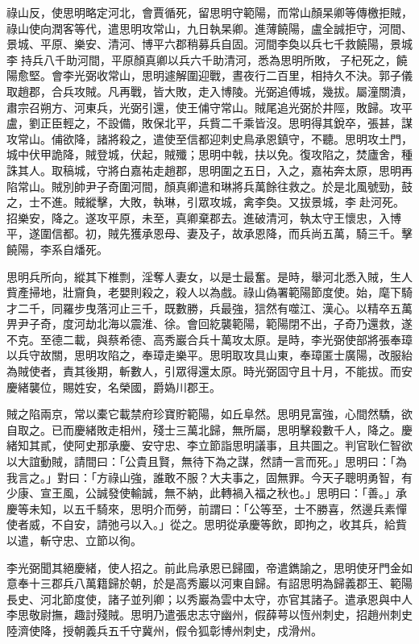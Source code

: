 \begin{pinyinscope}
 祿山反，使思明略定河北，會賈循死，留思明守範陽，而常山顏杲卿等傳檄拒賊，祿山使向潤客等代，遣思明攻常山，九日執杲卿。進薄饒陽，盧全誠拒守，河間、景城、平原、樂安、清河、博平六郡稍募兵自固。河間李奐以兵七千救饒陽，景城李持兵八千助河間，平原顏真卿以兵六千助清河，悉為思明所敗，子杞死之，饒陽愈堅。會李光弼收常山，思明遽解圍迎戰，晝夜行二百里，相持久不決。郭子儀取趙郡，合兵攻賊。凡再戰，皆大敗，走入博陵。光弼追傅城，幾拔。屬潼關潰，肅宗召朔方、河東兵，光弼引還，使王俌守常山。賊尾追光弼於井陘，敗歸。攻平盧，劉正臣輕之，不設備，敗保北平，兵貲二千乘皆沒。思明得其銳卒，張甚，謀攻常山。俌欲降，諸將殺之，遣使至信都迎刺史鳥承恩鎮守，不聽。思明攻土門，城中伏甲詭降，賊登城，伏起，賊殲；思明中戟，扶以免。復攻陷之，焚廬舍，種誅其人。取稿城，守將白嘉祐走趙郡，思明圍之五日，入之，嘉祐奔太原，思明再陷常山。賊別帥尹子奇圍河間，顏真卿遣和琳將兵萬餘往救之。於是北風號勁，鼓之，士不進。賊縱擊，大敗，執琳，引眾攻城，禽李奐。又拔景城，李赴河死。招樂安，降之。遂攻平原，未至，真卿棄郡去。進破清河，執太守王懷忠，入博平，遂圍信都。初，賊先獲承恩母、妻及子，故承恩降，而兵尚五萬，騎三千。擊饒陽，李系自燔死。



 思明兵所向，縱其下椎剽，淫奪人妻女，以是士最奮。是時，舉河北悉入賊，生人貲產掃地，壯齎負，老嬰則殺之，殺人以為戲。祿山偽署範陽節度使。始，麾下騎才二千，同羅步曳落河止三千，既數勝，兵最強，狺然有噬江、漢心。以精卒五萬畀尹子奇，度河劫北海以震淮、徐。會回紇襲範陽，範陽閉不出，子奇乃還救，遂不克。至德二載，與蔡希德、高秀巖合兵十萬攻太原。是時，李光弼使部將張奉璋以兵守故關，思明攻陷之，奉璋走樂平。思明取攻具山東，奉璋匿士廣陽，改服紿為賊使者，責其後期，斬數人，引眾得還太原。時光弼固守且十月，不能拔。而安慶緒襲位，賜姓安，名榮國，爵媯川郡王。



 賊之陷兩京，常以橐它載禁府珍寶貯範陽，如丘阜然。思明見富強，心間然驕，欲自取之。已而慶緒敗走相州，殘士三萬北歸，無所屬，思明擊殺數千人，降之。慶緒知其貳，使阿史那承慶、安守忠、李立節詣思明議事，且共圖之。判官耿仁智欲以大誼動賊，請間曰：「公貴且賢，無待下為之謀，然請一言而死。」思明曰：「為我言之。」對曰：「方祿山強，誰敢不服？大夫事之，固無罪。今天子聰明勇智，有少康、宣王風，公誠發使輸誠，無不納，此轉禍入福之秋也。」思明曰：「善。」承慶等未知，以五千騎來，思明介而勞，前謂曰：「公等至，士不勝喜，然邊兵素憚使者威，不自安，請弛弓以入。」從之。思明從承慶等飲，即拘之，收其兵，給貲以遣，斬守忠、立節以徇。



 李光弼聞其絕慶緒，使人招之。前此烏承恩已歸國，帝遣鐫諭之，思明使牙門金如意奉十三郡兵八萬籍歸於朝，於是高秀巖以河東自歸。有詔思明為歸義郡王、範陽長史、河北節度使，諸子並列卿；以秀巖為雲中太守，亦官其諸子。遣承恩與中人李思敬尉撫，趣討殘賊。思明乃遣張忠志守幽州，假薛萼以恆州刺史，招趙州刺史陸濟使降，授朝義兵五千守冀州，假令狐彰博州刺史，戍滑州。




\end{pinyinscope}
